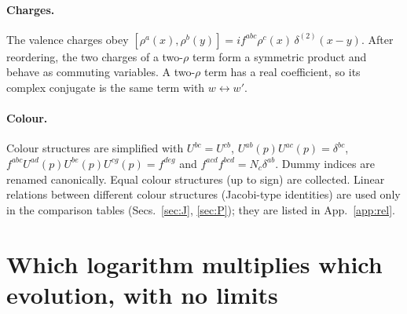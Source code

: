 \documentclass[10pt]{article}
\numberwithin{equation}{section}
\begin{document}
\paragraph{Charges.} The valence charges obey $[\rho^a(x),\rho^b(y)]=if^{abc}\rho^c(x)\,\delta^{(2)}(x-y)$. After reordering, the two charges of a two-$\rho$ term form a symmetric product and behave as commuting variables. A two-$\rho$ term has a real coefficient, so its complex conjugate is the same term with $w\leftrightarrow w'$.

\paragraph{Colour.} Colour structures are simplified with $U^{bc}=U^{cb}$, $U^{ab}(p)U^{ac}(p)=\delta^{bc}$, $f^{abc}U^{ad}(p)U^{be}(p)U^{cg}(p)=f^{deg}$ and $f^{acd}f^{bcd}=N_c\delta^{ab}$. Dummy indices are renamed canonically. Equal colour structures (up to sign) are collected. Linear relations between different colour structures (Jacobi-type identities) are used only in the comparison tables (Secs.~\ref{sec:J}, \ref{sec:P}); they are listed in App.~\ref{app:rel}.

\section{Which logarithm multiplies which evolution, with no limits}\label{sec:which}
\end{document}
